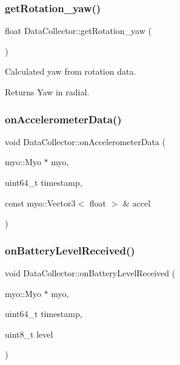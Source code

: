 \subsubsection{\texorpdfstring{get\+Rotation\+\_\+yaw()}{getRotation\_yaw()}}
{\footnotesize\ttfamily float Data\+Collector\+::get\+Rotation\+\_\+yaw (\begin{DoxyParamCaption}{ }\end{DoxyParamCaption})\hspace{0.3cm}{\ttfamily [inline]}}



Calculated yaw from rotation data. 

\begin{DoxyReturn}{Returns}
Yaw in radial. 
\end{DoxyReturn}
\mbox{\label{class_data_collector_af284c1bda701eb04d8278848672a1be6}} 
\subsubsection{\texorpdfstring{on\+Accelerometer\+Data()}{onAccelerometerData()}}
{\footnotesize\ttfamily void Data\+Collector\+::on\+Accelerometer\+Data (\begin{DoxyParamCaption}\item[{myo\+::\+Myo $\ast$}]{myo,  }\item[{uint64\+\_\+t}]{timestamp,  }\item[{const myo\+::\+Vector3$<$ float $>$ \&}]{accel }\end{DoxyParamCaption})}

\mbox{\label{class_data_collector_a56a6c61925d54439459fc1599f76c601}} 
\subsubsection{\texorpdfstring{on\+Battery\+Level\+Received()}{onBatteryLevelReceived()}}
{\footnotesize\ttfamily void Data\+Collector\+::on\+Battery\+Level\+Received (\begin{DoxyParamCaption}\item[{myo\+::\+Myo $\ast$}]{myo,  }\item[{uint64\+\_\+t}]{timestamp,  }\item[{uint8\+\_\+t}]{level }\end{DoxyParamCaption})}

